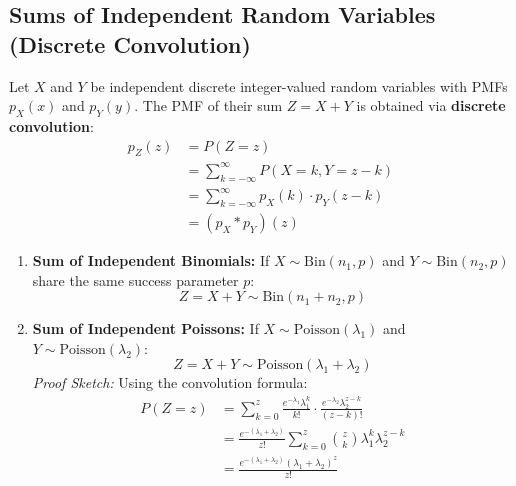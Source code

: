 \documentclass[12pt,a4paper]{article}
\begin{document}
\subsection{Sums of Independent Random Variables (Discrete Convolution)}
Let $X$ and $Y$ be independent discrete integer-valued random variables with PMFs $p_X(x)$ and $p_Y(y)$. The PMF of their sum $Z = X + Y$ is obtained via \textbf{discrete convolution}:
\begin{equation}
  \begin{aligned}
    p_Z(z) &= P(Z = z) \\[3pt]
    &= \sum_{k=-\infty}^\infty P(X = k, Y = z - k) \\[3pt]
    &= \sum_{k=-\infty}^\infty p_X(k) \cdot p_Y(z - k) \\[3pt]
    &= (p_X * p_Y)(z)
  \end{aligned}
\end{equation}
\begin{tcolorbox}[formulabox, title={\textbf{Reproductive (Convolution) Properties of Key Discrete Distributions}}]
\begin{enumerate}[leftmargin=*, itemsep=3pt]
  \item \textbf{Sum of Independent Binomials:} If $X \sim \text{Bin}(n_1, p)$ and $Y \sim \text{Bin}(n_2, p)$ share the same success parameter $p$:
  \begin{equation}
    Z = X + Y \sim \text{Bin}(n_1 + n_2, p)
  \end{equation}
  \item \textbf{Sum of Independent Poissons:} If $X \sim \text{Poisson}(\lambda_1)$ and $Y \sim \text{Poisson}(\lambda_2)$:
  \begin{equation}
    Z = X + Y \sim \text{Poisson}(\lambda_1 + \lambda_2)
  \end{equation}
  \textit{Proof Sketch:} Using the convolution formula:
  \begin{equation}
    \begin{aligned}
      P(Z = z) &= \sum_{k=0}^z \frac{e^{-\lambda_1} \lambda_1^k}{k!} \cdot \frac{e^{-\lambda_2} \lambda_2^{z-k}}{(z-k)!} \\[3pt]
      &= \frac{e^{-(\lambda_1+\lambda_2)}}{z!} \sum_{k=0}^z \binom{z}{k} \lambda_1^k \lambda_2^{z-k} \\[3pt]
      &= \frac{e^{-(\lambda_1+\lambda_2)} (\lambda_1+\lambda_2)^z}{z!}
    \end{aligned}
  \end{equation}
\end{enumerate}
\end{tcolorbox}
\end{document}

